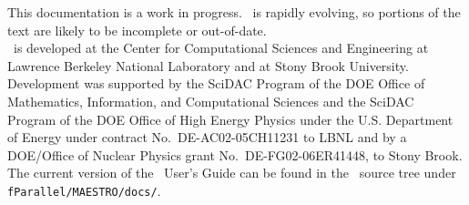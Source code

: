 This documentation is a work in progress.  \maestro\ is rapidly
evolving, so portions of the text are likely to be incomplete or
out-of-date. \\

\noindent \maestro\ is developed at the Center for Computational Sciences and
Engineering at Lawrence Berkeley National Laboratory and at Stony
Brook University.  Development was supported by the SciDAC Program of
the DOE Office of Mathematics, Information, and Computational Sciences
and the SciDAC Program of the DOE Office of High Energy Physics under
the U.S. Department of Energy under contract No.\ DE-AC02-05CH11231 to
LBNL and by a DOE/Office of Nuclear Physics grant No.\
DE-FG02-06ER41448, to Stony Brook. \\

\noindent The current version of the \maestro\ User's Guide can be found in 
the \maestro\ source tree under {\tt fParallel/MAESTRO/docs/}.
